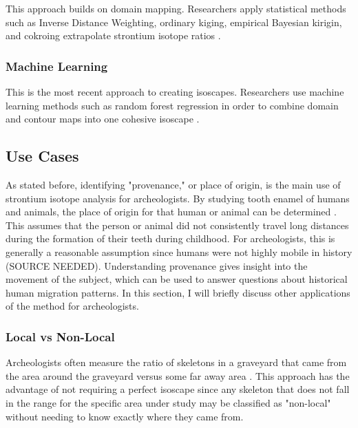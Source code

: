 \documentclass[a4paper, 12pt]{article}
\begin{document}
This approach builds on domain mapping. Researchers apply statistical methods
such as Inverse Distance Weighting, ordinary kiging, empirical Bayesian kirigin,
and cokroing extrapolate strontium isotope ratios \citep{holt2021}.

\subsubsection{Machine Learning}
This is the most recent approach to creating isoscapes. Researchers use machine
learning methods such as random forest regression in order to combine domain and contour
maps into one cohesive isoscape \citep{willmes2018}.





\subsection{Use Cases}
As stated before, identifying "provenance," or place of origin, is the main use of
strontium isotope analysis for archeologists. By studying tooth enamel of humans and animals, the place of origin for that human
or animal can be determined \citep{holt2021}. This assumes that the person or animal did not
consistently travel long distances during the formation of their teeth during childhood. For archeologists, this is generally
a reasonable assumption since humans were not highly mobile in history (SOURCE NEEDED).
Understanding provenance gives insight into the movement of the subject, which can
be used to answer questions about historical human migration patterns. In this section, I will briefly discuss other
applications of the method for archeologists.

\subsubsection{Local vs Non-Local}
Archeologists often measure the ratio of
skeletons in a graveyard that came from the area around the graveyard versus some
far away area \citep{holt2021}. This approach has the advantage of not requiring
a perfect isoscape since any skeleton that does not fall in the range for the specific
area under study may be classified as "non-local" without needing to know exactly where
they came from.
\end{document}
